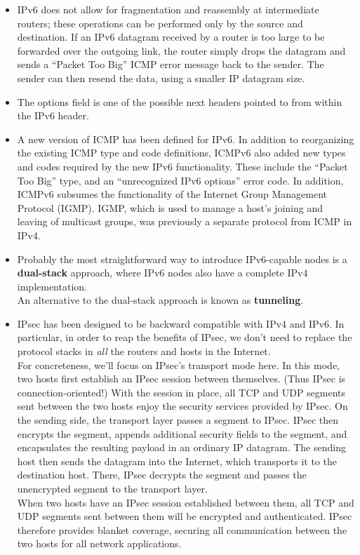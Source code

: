 \begin{itemize}
\item
IPv6 does not allow for fragmentation and reassembly at intermediate routers; these operations can be performed only by the source and destination. If an IPv6 datagram received by a router is too large to be forwarded over the outgoing link, the router simply drops the datagram and sends a ``Packet Too Big'' ICMP error message back to the sender. The sender can then resend the data, using a smaller IP datagram size.

\item
The options field is one of the possible next headers pointed to from within the IPv6 header.

\item
A new version of ICMP has been defined for IPv6. In addition to reorganizing the existing ICMP type and code definitions, ICMPv6 also added new types and codes required by the new IPv6 functionality. These include the ``Packet Too Big'' type, and an ``unrecognized IPv6 options'' error code. In addition, ICMPv6 subsumes the functionality of the Internet Group Management Protocol (IGMP). IGMP, which is used to manage a host's joining and leaving of multicast groups, was previously a separate protocol from ICMP in IPv4.

\item
Probably the most straightforward way to introduce IPv6-capable nodes is a \textbf{dual-stack} approach, where IPv6 nodes also have a complete IPv4 implementation.\\
An alternative to the dual-stack approach is known as \textbf{tunneling}.

\item
IPsec has been designed to be backward compatible with IPv4 and IPv6. In particular, in order to reap the benefits of IPsec, we don't need to replace the protocol stacks in \textit{all} the routers and hosts in the Internet.\\
For concreteness, we'll focus on IPsec's transport mode here. In this mode, two hosts first establish an IPsec session between themselves. (Thus IPsec is connection-oriented!) With the session in place, all TCP and UDP segments sent between the two hosts enjoy the security services provided by IPsec. On the sending side, the transport layer passes a segment to IPsec. IPsec then encrypts the segment, appends additional security fields to the segment, and encapsulates the resulting payload in an ordinary IP datagram. The sending host then sends the datagram into the Internet, which transports it to the destination host. There, IPsec decrypts the segment and passes the unencrypted segment to the transport layer.\\
When two hosts have an IPsec session established between them, all TCP and UDP segments sent between them will be encrypted and authenticated. IPsec therefore provides blanket coverage, securing all communication between the two hosts for all network applications.


\end{itemize}
